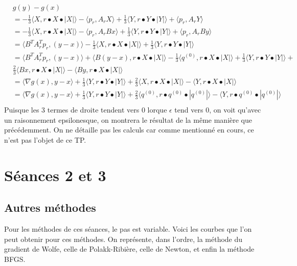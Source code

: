 \documentclass[11pt]{article}
\begin{document}
\begin{align*}
&g(y) - g(x) \\
&= -\frac{1}{3} \langle X,r \bullet X \bullet |X|\rangle  - \langle p_r,A_rX\rangle  + \frac{1}{3}\langle Y,r \bullet Y \bullet |Y|\rangle  + \langle p_r,A_rY\rangle   \\
&= -\frac{1}{3} \langle X,r \bullet X \bullet |X|\rangle  - \langle p_r,A_rBx\rangle  + \frac{1}{3}\langle Y,r \bullet Y \bullet |Y|\rangle  + \langle p_r,A_rBy\rangle   \\
&= \langle B^TA_r^Tp_r,(y - x)\rangle -\frac{1}{3} \langle X,r \bullet X \bullet |X|\rangle + \frac{1}{3}\langle Y,r \bullet Y \bullet |Y|\rangle \\
&= \langle B^TA_r^Tp_r,(y - x)\rangle + \langle B(y-x),r \bullet X \bullet |X|\rangle - \frac{1}{3}\langle q^{(0)},r \bullet X \bullet |X|\rangle + \frac{1}{3}\langle Y,r \bullet Y \bullet |Y|\rangle + \\
&\frac{2}{3} \langle Bx,r \bullet X \bullet |X|\rangle -  \langle By,r \bullet X \bullet |X|\rangle\\
&=  \langle \nabla g(x),y-x\rangle + \frac{1}{3}\langle Y,r \bullet Y \bullet |Y|\rangle + \frac{2}{3} \langle X,r \bullet X \bullet |X|\rangle -  \langle Y,r \bullet X \bullet |X|\rangle \\
&= \langle \nabla g(x),y-x\rangle + \frac{1}{3}\langle Y,r \bullet Y \bullet |Y|\rangle + \frac{2}{3} \langle q^{(0)},r \bullet q^{(0)} \bullet |q^{(0)}|\rangle -  \langle Y,r \bullet q^{(0)} \bullet |q^{(0)}|\rangle \\
\end{align*}
Puisque les 3 termes de droite tendent vers 0 lorque $\epsilon$ tend vers 0, on voit qu'avec un raisonnement epsilonesque, on montrera le résultat de la même manière que précédemment. On ne détaille pas les calculs car comme mentionné en cours, ce n'est pas l'objet de ce TP.

\section*{Séances 2 et 3}

\subsection*{Autres méthodes}

Pour les méthodes de ces séances, le pas est variable. Voici les courbes que l'on peut obtenir pour ces méthodes. On représente, dans l'ordre, la méthode du gradient de Wolfe, celle de Polakk-Ribière, celle de Newton, et enfin la méthode BFGS.
\end{document}
